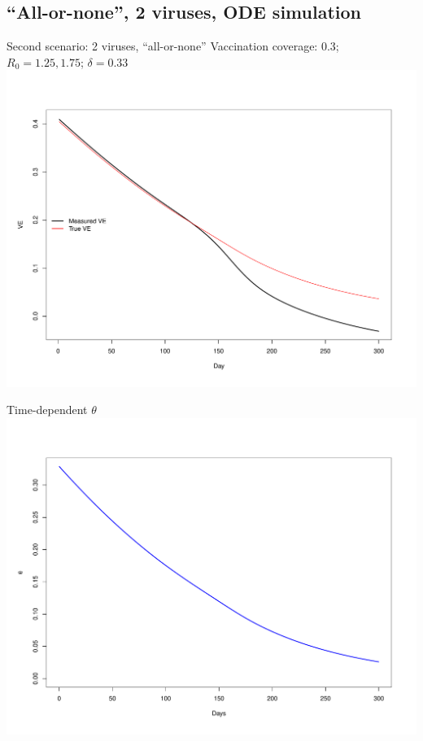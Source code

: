 \documentclass{beamer}
\begin{document}
\subsection{``All-or-none'', 2 viruses, ODE simulation}
\begin{frame}{Second scenario: 2 viruses, ``all-or-none''}
Vaccination coverage: 0.3; $R_0=1.25, 1.75$; $\delta = 0.33$
\centering
\includegraphics[width=.8\textwidth]{VE_2_virus.pdf}
\end{frame}
%
\begin{frame}{Time-dependent $\theta$}
\centering
\includegraphics[width=.9\textwidth]{theta_time.pdf}
\end{frame}
%
\end{document}
